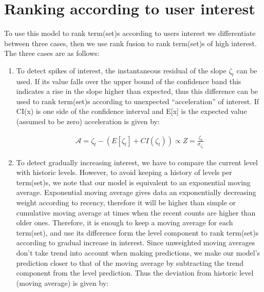 \documentclass[11pt]{llncs} %
\begin{document}
\section{Ranking according to user interest}
To use this model to rank term(set)s according to users interest we differentiate between three cases, then we use rank fusion to rank term(set)s of high interest. The three cases are as follows:
\begin{enumerate}
\item To detect spikes of interest, the instantaneous residual of the slope $\zeta_{t}$ can be used. If its value falls over the upper bound of the confidence band this indicates a rise in the slope higher than expected, thus this difference can be used to rank term(set)s according to unexpected ``acceleration'' of interest. If CI(x) is one side of the confidence interval and E[x] is the expected value (assumed to be zero) acceleration is given by: 
\begin{center}
\begin{equation}
\begin{array}{c}
\mathcal{A} = \zeta_{t} - (E[\zeta_{t}] + CI(\zeta_{t})) \propto Z = \frac{\zeta_{t}}{\sigma_{\zeta_{t}}}
\end{array}
\end{equation}
\end{center}
\item To detect gradually increasing interest, we have to compare the current level with historic levels. However, to avoid keeping a history of levels per term(set)s, we note that our model is equivalent to an exponential moving average. Exponential moving average gives data an exponentially decreasing weight according to recency, therefore it will be higher than simple or cumulative moving average at times when the recent counts are higher than older ones. Therefore, it is enough to keep a moving average for each term(set), and use its difference form the level component to rank term(set)s according to gradual increase in interest. Since unweighted moving averages don't take trend into account when making predictions, we make our model's prediction closer to that of the moving average by subtracting the trend component from the level prediction. Thus the deviation from historic level (moving average) is given by:

\end{enumerate}
\end{document}
